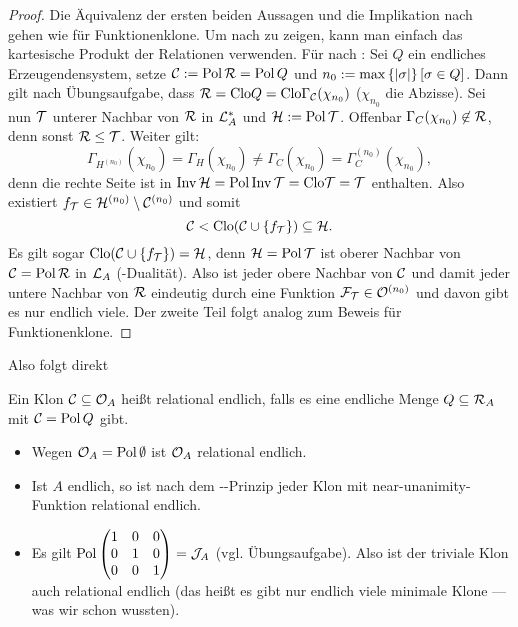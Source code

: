 \documentclass{book}
\begin{document}
\begin{proof}
    Die Äquivalenz der ersten beiden Aussagen und die Implikation  nach  gehen wie für Funktionenklone.
    Um  nach  zu zeigen, kann man einfach das kartesische Produkt der Relationen verwenden. Für  nach : Sei $Q$ ein endliches Erzeugendensystem, setze $\mathcal{C}:=\mathop\mathrm{Pol}\mathcal{R}=\mathop\mathrm{Pol} Q$ und $n_0:=\max\left\{\left|\sigma\right|\right\}[\sigma\in Q]$. Dann gilt nach Übungsaufgabe, dass $\mathcal{R} = \mathrm{Clo} Q = \mathrm{Clo} \Gamma_{\mathcal{C}}(\chi_{n_0})$ ($\chi_{n_0}$ die Abzisse). Sei nun $\mathcal{T}$ unterer Nachbar von $\mathcal{R}$ in $\mathcal{L}^{\ast}_A$ und $\mathcal{H}:=\mathop\mathrm{Pol} \mathcal{T}$. Offenbar $\Gamma_C(\chi_{n_0})\not\in\mathcal{R}$, denn sonst $\mathcal{R}\leq \mathcal{T}$. Weiter gilt:
    $$
\Gamma_{H^{(n_0)}}(\chi_{n_0})=\Gamma_H(\chi_{n_0})\neq\Gamma_C(\chi_{n_0})=\Gamma_C^{(n_0)}(\chi_{n_0}),
$$
denn  die rechte Seite ist in $\mathop\mathrm{Inv}\mathcal{H}=\mathop\mathrm{Pol}\mathop\mathrm{Inv}\mathcal{T}=\mathrm{Clo} \mathcal{T}=\mathcal{T}$ enthalten. Also existiert $f_{\mathcal{T}}\in \mathcal{H}^{(n_0)}\setminus\mathcal{C}^{(n_0)}$ und somit
$$
\mathcal{C}<\mathrm{Clo}(\mathcal{C}\cup\left\{f_{\mathcal{T}}\right\})\subseteq \mathcal{H}.
    $$
    Es gilt sogar $\mathrm{Clo}(\mathcal{C}\cup\left\{f_{\mathcal{T}}\right\})=\mathcal{H}$, denn $\mathcal{H}=\mathop\mathrm{Pol}\mathcal{T}$ ist oberer Nachbar von $\mathcal{C}=\mathop\mathrm{Pol}\mathcal{R}$ in $\mathcal{L}_A$ (-Dualität).
    Also ist jeder obere Nachbar von $\mathcal{C}$ und damit jeder untere Nachbar von $\mathcal{R}$ eindeutig durch eine Funktion $\mathcal{F}_{\mathcal{T}}\in\mathcal{O}^{(n_0)}$ und davon gibt es nur endlich viele.
    Der zweite Teil folgt analog zum Beweis für Funktionenklone.
\end{proof}

Also folgt direkt

\begin{definition}
    Ein Klon $\mathcal{C}\subseteq \mathcal{O}_A$ heißt relational endlich, falls es eine endliche Menge $Q\subseteq \mathcal{R}_A$ mit $\mathcal{C}=\mathop\mathrm{Pol} Q$ gibt.
\end{definition}

\begin{example}
    \begin{itemize}
            \item Wegen $\mathcal{O}_A=\mathop\mathrm{Pol}\emptyset$ ist $\mathcal{O}_A$ relational endlich.
            \item Ist $A$ endlich, so ist nach dem --Prinzip jeder Klon mit near-unanimity-Funktion relational endlich.
            \item Es gilt $\mathop\mathrm{Pol}
        \begin{pmatrix}
            1 & 0 & 0\\
            0 & 1 & 0\\
            0 & 0 & 1
        \end{pmatrix}=\mathcal{J}_A$ (vgl. Übungsaufgabe). Also ist der triviale Klon auch relational endlich (das heißt es gibt nur endlich viele minimale Klone --- was wir schon wussten).
    \end{itemize}    
\end{example}
\end{document}

